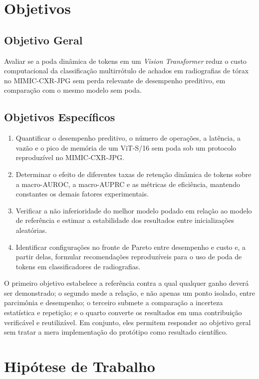 \documentclass[10pt,a4paper]{extarticle}
\begin{document}
\section{Objetivos}

\subsection{Objetivo Geral}

Avaliar se a poda dinâmica de tokens em um \emph{Vision Transformer} reduz o custo computacional da classificação multirrótulo de achados em radiografias de tórax no MIMIC-CXR-JPG sem perda relevante de desempenho preditivo, em comparação com o mesmo modelo sem poda.

\subsection{Objetivos Específicos}

\begin{enumerate}[label=\textbf{OE\arabic*.}]
  \item Quantificar o desempenho preditivo, o número de operações, a latência, a vazão e o pico de memória de um ViT-S/16 sem poda sob um protocolo reproduzível no MIMIC-CXR-JPG.
  \item Determinar o efeito de diferentes taxas de retenção dinâmica de tokens sobre a macro-AUROC, a macro-AUPRC e as métricas de eficiência, mantendo constantes os demais fatores experimentais.
  \item Verificar a não inferioridade do melhor modelo podado em relação ao modelo de referência e estimar a estabilidade dos resultados entre inicializações aleatórias.
  \item Identificar configurações no fronte de Pareto entre desempenho e custo e, a partir delas, formular recomendações reproduzíveis para o uso de poda de tokens em classificadores de radiografias.
\end{enumerate}

O primeiro objetivo estabelece a referência contra a qual qualquer ganho deverá ser demonstrado; o segundo mede a relação, e não apenas um ponto isolado, entre parcimônia e desempenho; o terceiro submete a comparação a incerteza estatística e repetição; e o quarto converte os resultados em uma contribuição verificável e reutilizável. Em conjunto, eles permitem responder ao objetivo geral sem tratar a mera implementação do protótipo como resultado científico.

\section{Hipótese de Trabalho}
\end{document}
